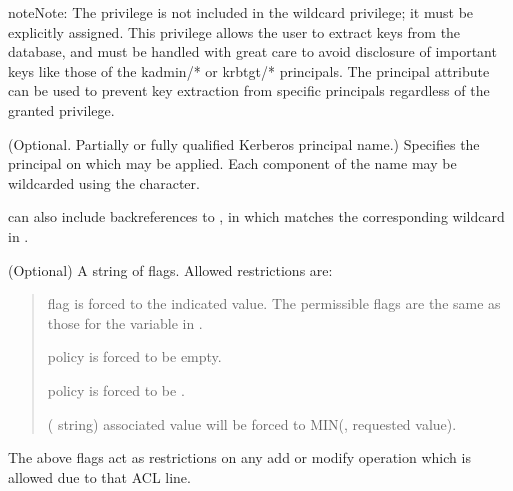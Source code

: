 \documentclass[letterpaper,10pt,english]{sphinxmanual}
\begin{document}
\begin{sphinxadmonition}{note}{Note:}
\sphinxAtStartPar
The  privilege is not included in the wildcard
privilege; it must be explicitly assigned.  This privilege
allows the user to extract keys from the database, and must be
handled with great care to avoid disclosure of important keys
like those of the kadmin/* or krbtgt/* principals.  The
 principal attribute can be used to prevent
key extraction from specific principals regardless of the
granted privilege.
\end{sphinxadmonition}
\begin{description}
\sphinxAtStartPar
(Optional. Partially or fully qualified Kerberos principal name.)
Specifies the principal on which  may be applied.
Each component of the name may be wildcarded using the \sphinxcode{\sphinxupquote{*}}
character.

\sphinxAtStartPar
{} can also include back\sphinxhyphen{}references to ,
in which  matches the corresponding wildcard in
.

\sphinxAtStartPar
(Optional) A string of flags. Allowed restrictions are:
\begin{quote}
\begin{description}
\sphinxAtStartPar
flag is forced to the indicated value.  The permissible flags
are the same as those for the 
variable in {\hyperref[\detokenize{admin/conf_files/kdc_conf:kdc-conf-5}]{}}.

\sphinxAtStartPar
policy is forced to be empty.

\sphinxAtStartPar
policy is forced to be .

\sphinxAtStartPar
( string) associated value will be forced to
MIN(, requested value).

\end{description}
\end{quote}

\sphinxAtStartPar
The above flags act as restrictions on any add or modify operation
which is allowed due to that ACL line.

\end{description}
\end{document}
